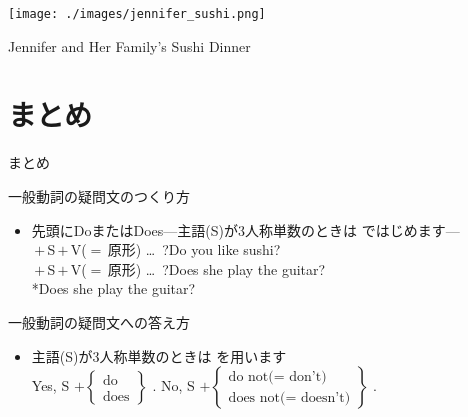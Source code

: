 \documentclass[aspectratio=169,dvipsnames]{beamer}
\begin{document}
\begin{frame}[plain]
 
\texttt{[image: ./images/jennifer\_sushi.png]}

Jennifer and Her Family's Sushi Dinner
\end{frame}
\section{まとめ}
\begin{frame}[plain]{まとめ}
 

\begin{block}{一般動詞の疑問文のつくり方}\small
\begin{itemize}[square]
 \item   先頭にDoまたはDoes\hspace{10pt}---主語(S)が3人称単数のときは\,\,ではじめます---\\
	 \,$+$\,S\,$+$\,V{\scriptsize ($=$\,原形)} \ldots\,\,\,?\hfill{}Do you like sushi?\\
	 \,$+$\,S\,$+$\,V{\scriptsize ($=$\,原形)} \ldots\,\,\,?\hfill{}Does she play the guitar?\\
\hfill{}*Does she play the guitar?
\end{itemize}
     \end{block}

\begin{block}{一般動詞の疑問文への答え方}\small
\begin{itemize}[square]
 \item 主語(S)が3人称単数のときは\,\,を用います\\
Yes, S $+ \left\{\begin{array}{l}
		  \text{do}\\
		\text{does}\end{array}\right\}$\,\,.
\hspace{20pt}
No, S $+ \left\{\begin{array}{l}
		  \text{do not($=$ don't)}\\
		\text{does not($=$ doesn't)}\end{array}\right\}$\,\,.
\end{itemize}
      \end{block}


\end{frame}
\end{document}
